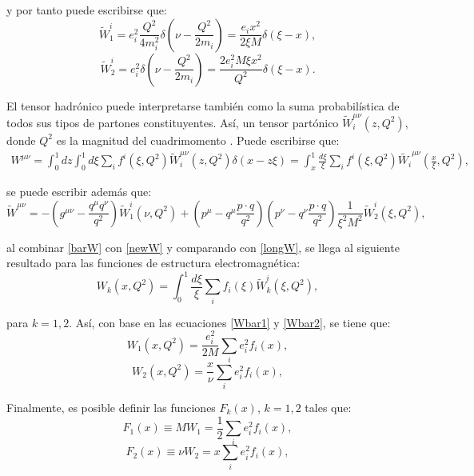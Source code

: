 \documentclass[titlepage,11pt]{report}
\begin{document}
\noindent y por tanto puede escribirse que:
\begin{equation}\label{Wbar1}
    \tilde{W}_1^i=e_i^2\frac{Q^2}{4m_i^2}\delta\left(\nu-\frac{Q^2}{2m_i}\right)=\frac{e_ix^2}{2\xi M}\delta(\xi-x),
\end{equation}
\begin{equation}\label{Wbar2}
    \tilde{W}_2^i=e_i^2\delta\left(\nu-\frac{Q^2}{2m_i}\right)=\frac{2e_i^2M\xi x^2}{Q^2}\delta(\xi-x).
\end{equation}

El tensor hadrónico puede interpretarse también como la suma probabilística de todos sus tipos de partones constituyentes. Así, un tensor partónico $\tilde{W}_i^{\mu\nu}(z,Q^2)$, donde $Q^2$ es la magnitud del cuadrimomento \cite{10.1063/PT.3.2624}. Puede escribirse que:
\begin{align}\label{newW}
    W^{\mu\nu}=\int_0^{1}dz\int_0^{1}d\xi \sum_if^{i}(\xi, Q^2)\tilde{W}_i^{\mu\nu}(z,Q^2)\delta(x-z\xi)=\int_x^{1}\frac{d\xi}{\xi}\sum_{i}f^i(\xi, Q^2)\tilde{W_i}^{\mu\nu}\left(\frac{x}{\xi}, Q^2\right),
\end{align}

\noindent se puede escribir además que:
\begin{equation}\label{barW}
    \tilde{W}^{\mu\nu}=-\left(g^{\mu\nu}-\frac{q^{\mu}q^{\nu}}{q^2}\right)\tilde{W}_1^i(\nu, Q^2)+\left(p^{\mu}-q^{\mu}\frac{p\cdot q}{q^2}\right)\left(p^{\nu}-q^{\nu}\frac{p\cdot q}{q^2}\right)\frac{1}{\xi^2 M^2}\tilde{W}_2^i(\xi, Q^2),
\end{equation}

al combinar \ref{barW} con \ref{newW} y comparando con \ref{longW}, se llega al siguiente resultado para las funciones de estructura electromagnética:
\begin{equation*}
    W_k(x,Q^2)=\int_0^{1}\frac{d\xi}{\xi}\sum_if_i(\xi)\tilde{W}_k^i(\xi, Q^2),
\end{equation*}

\noindent para $k=1,2$. Así, con base en las ecuaciones \ref{Wbar1} y \ref{Wbar2}, se tiene que:
\begin{equation*}
    W_1(x,Q^2)=\frac{e_i^2}{2M}\sum_ie_i^2f_i(x),
\end{equation*}
\begin{equation*}
    W_2(x,Q^2)=\frac{x}{\nu}\sum_ie_i^2f_i(x),
\end{equation*}

Finalmente, es posible definir las funciones $F_k(x)$, $k=1,2$ tales que:
\begin{equation}
    F_1(x)\equiv MW_1=\frac{1}{2}\sum_ie_i^2f_i(x),
\end{equation}
\begin{equation}
    F_2(x)\equiv \nu W_2=x\sum_ie_i^2f_i(x),
\end{equation}
\end{document}
